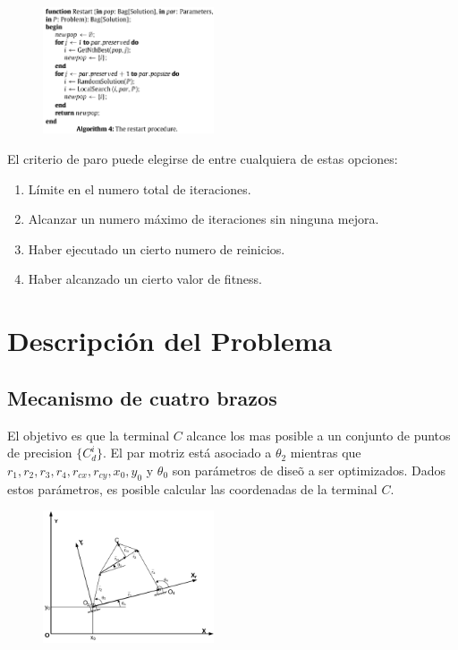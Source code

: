 \documentclass[10pt,journal,compsoc]{styles/IEEEtran}
\begin{document}
    \begin{figure}[H]
    \centering
    \includegraphics[width = 0.45\textwidth]{alg4.png}
    \caption{}
  	\end{figure}

El criterio de paro puede elegirse de entre cualquiera de estas opciones:

   \begin{enumerate}
   \item L\'imite en el numero total de iteraciones.
   \item Alcanzar un numero máximo de iteraciones sin ninguna mejora.
   \item Haber ejecutado un cierto numero de reinicios.
   \item Haber alcanzado un cierto valor de fitness.
   \end{enumerate}

\section{Descripci\'on del Problema}

\subsection{Mecanismo de cuatro brazos}

El objetivo es que la terminal $C$ alcance los mas posible a un conjunto de puntos de precision $\{C_d^i\}$. El par motriz est\'a asociado a $\theta_2$ mientras que $r_1,r_2,r_3,r_4,r_{cx},r_{cy},x_0,y_0$ y $\theta_0$ son parámetros de dise\~o a ser optimizados. Dados estos parámetros, es posible calcular las coordenadas de la terminal $C$.\\

   \begin{figure}[H]
    \centering
    \includegraphics[width = 0.45\textwidth]{mecha.png}
    \caption{}
  \end{figure}
  
\end{document}
